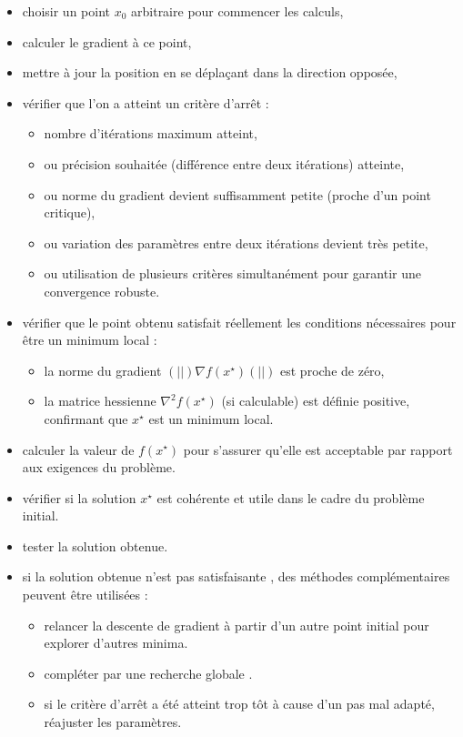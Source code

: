 \documentclass[10pt,french]{report}
\begin{document}
    \begin{itemize}
        \item choisir un point $x_0$ arbitraire pour commencer les calculs,
        \item calculer le gradient à ce point,
        \item mettre à jour la position en se déplaçant dans la direction opposée,
        \item vérifier que l'on a atteint un critère d'arrêt :
        \begin{itemize}
            \item nombre d'itérations maximum atteint,
            \item ou précision souhaitée (différence entre deux itérations) atteinte,
			\item ou norme du gradient devient suffisamment petite (proche d'un point critique),
			\item ou variation des paramètres entre deux itérations devient très petite,
			\item ou utilisation de plusieurs critères simultanément pour garantir une convergence robuste.
        \end{itemize}
		\item vérifier que le point obtenu satisfait réellement les conditions nécessaires pour être un minimum local :
		\begin{itemize}
			\item la norme du gradient $(\vert \vert)\nabla f\left(x^\star\right)(\vert \vert)$ est proche de zéro, 
			\item la matrice hessienne $\nabla^2 f\left(x^\star\right)$ (si calculable) est définie positive, confirmant que $x^\star$ est un minimum local.
		\end{itemize}
		\item calculer la valeur de $f(x^\star)$ pour s'assurer qu'elle est acceptable par rapport aux exigences du problème.
        \item vérifier si la solution $x^\star$ est cohérente et utile dans le cadre du problème initial.
		\item tester la solution obtenue.
		\item si la solution obtenue n'est pas satisfaisante , des méthodes complémentaires peuvent être utilisées :
		\begin{itemize}
			\item relancer la descente de gradient à partir d'un autre point initial pour explorer d'autres minima.
			\item compléter par une recherche globale .
			\item si le critère d'arrêt a été atteint trop tôt à cause d'un pas mal adapté, réajuster les paramètres.
		\end{itemize}
    \end{itemize}
\end{document}
